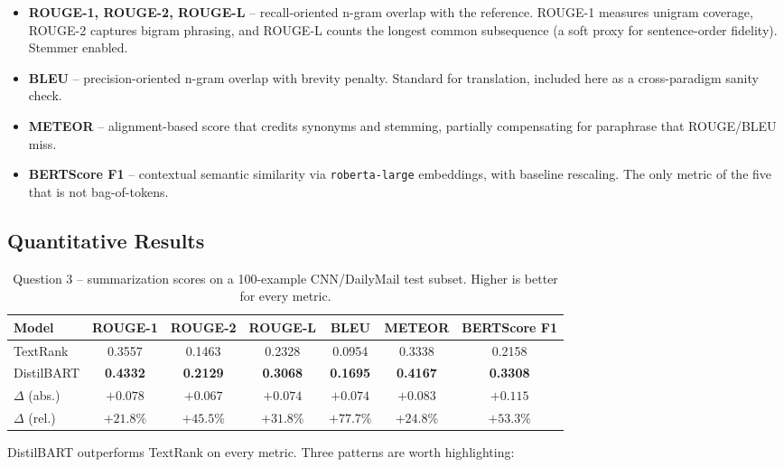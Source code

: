 \documentclass[11pt,a4paper]{article}
\begin{document}
\begin{itemize}[noitemsep]
    \item \textbf{ROUGE-1, ROUGE-2, ROUGE-L} -- recall-oriented n-gram
    overlap with the reference. ROUGE-1 measures unigram coverage,
    ROUGE-2 captures bigram phrasing, and ROUGE-L counts the longest
    common subsequence (a soft proxy for sentence-order fidelity).
    Stemmer enabled.
    \item \textbf{BLEU} -- precision-oriented n-gram overlap with brevity
    penalty. Standard for translation, included here as a
    cross-paradigm sanity check.
    \item \textbf{METEOR} -- alignment-based score that credits
    synonyms and stemming, partially compensating for paraphrase that
    ROUGE/BLEU miss.
    \item \textbf{BERTScore F1} -- contextual semantic similarity via
    \texttt{roberta-large} embeddings, with baseline rescaling. The
    only metric of the five that is not bag-of-tokens.
\end{itemize}

\subsection{Quantitative Results}

\begin{table}[H]
\centering
\caption{Question 3 -- summarization scores on a 100-example
CNN/DailyMail test subset. Higher is better for every metric.}
\label{tab:q3-metrics}
\begin{tabular}{lcccccc}
\toprule
\textbf{Model} & \textbf{ROUGE-1} & \textbf{ROUGE-2} & \textbf{ROUGE-L} & \textbf{BLEU} & \textbf{METEOR} & \textbf{BERTScore F1} \\
\midrule
TextRank        & 0.3557 & 0.1463 & 0.2328 & 0.0954 & 0.3338 & 0.2158 \\
DistilBART      & \textbf{0.4332} & \textbf{0.2129} & \textbf{0.3068} & \textbf{0.1695} & \textbf{0.4167} & \textbf{0.3308} \\
\midrule
$\Delta$ (abs.) & $+0.078$ & $+0.067$ & $+0.074$ & $+0.074$ & $+0.083$ & $+0.115$ \\
$\Delta$ (rel.) & $+21.8\%$ & $+45.5\%$ & $+31.8\%$ & $+77.7\%$ & $+24.8\%$ & $+53.3\%$ \\
\bottomrule
\end{tabular}
\end{table}

DistilBART outperforms TextRank on every metric. Three patterns are
worth highlighting:
\end{document}
